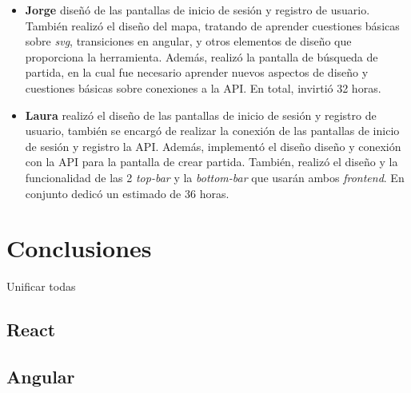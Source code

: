 \documentclass[11pt, a4paper, titlepage]{article}
\begin{document}
\begin{itemize}
    \item \textbf{Jorge} diseñó de las pantallas de inicio de sesión y registro de usuario. También realizó el diseño del mapa, tratando de aprender cuestiones básicas sobre \textit{svg}, transiciones en angular, y otros elementos de diseño que proporciona la herramienta. Además, realizó la pantalla de búsqueda de partida, en la cual fue necesario aprender nuevos aspectos de diseño y cuestiones básicas sobre conexiones a la API. En total, invirtió 32 horas.

    \item \textbf{Laura} realizó el diseño de las pantallas de inicio de sesión y registro de usuario, también se encargó de realizar la conexión de las pantallas de inicio de sesión y registro la API. Además, implementó el diseño diseño y conexión con la API para la pantalla de crear partida. También, realizó el diseño y la funcionalidad de las 2 \textit{top-bar} y la \textit{bottom-bar} que usarán ambos \textit{frontend}. En conjunto dedicó un estimado de 36 horas.
\end{itemize}

\section{Conclusiones}
Unificar todas

\subsection{React}
\subsection{Angular}
\end{document}
